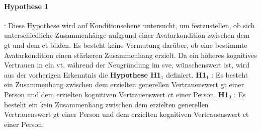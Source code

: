 \documentclass[a4paper,11pt]{article}%
\renewcommand{\\}{\vspace*{0.5\baselineskip} \newline}
\begin{document}
\paragraph{Hypothese 1}:
Diese Hypothese wird auf Konditionsebene untersucht, um festzustellen, ob sich unterschiedliche Zusammenhänge aufgrund einer Avatarkondition zwischen dem \ac{gt} und dem \ac{ct} bilden.
Es besteht keine Vermutung darüber, ob eine bestimmte Avatarkondition einen stärkeren Zusammenhang erzielt. \newline
Da ein höheres kognitives Vertrauen in ein \ac{vt}, während der Neugründung im \ac{sve}, wünschenswert ist, wird aus der vorherigen Erkenntnis die \textbf{Hypothese H1$_{1}$} definiert.\\
\textbf{H1$_{1}$} : Es besteht ein Zusammenhang zwischen dem erzielten generellen Vertrauenswert \ac{gt} einer Person und dem erzielten kognitiven Vertrauenswert \ac{ct} einer Person. \newline
\textbf{H1$_{0}$} : Es besteht ein kein Zusammenhang zwischen dem erzielten generellen Vertrauenswert \ac{gt} einer Person und dem erzielten kognitiven Vertrauenswert \ac{ct} einer Person.

\end{document}
